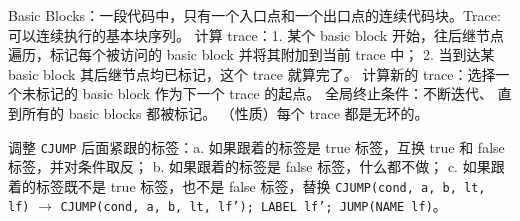 \par \noindent Basic Blocks：一段代码中，只有一个入口点和一个出口点的连续代码块。Trace: 可以连续执行的基本块序列。
计算 trace：1. 某个 basic block 开始，往后继节点遍历，标记每个被访问的 basic block 并将其附加到当前 trace 中；
2. 当到达某 basic block 其后继节点均已标记，这个 trace 就算完了。
计算新的 trace：选择一个未标记的 basic block 作为下一个 trace 的起点。
全局终止条件：不断迭代、 直到所有的 basic blocks 都被标记。
（性质）每个 trace 都是无环的。

\par \noindent 调整 \texttt{CJUMP} 后面紧跟的标签：a. 如果跟着的标签是 true 标签，互换 true 和 false 标签，并对条件取反；
b. 如果跟着的标签是 false 标签，什么都不做；
c. 如果跟着的标签既不是 true 标签，也不是 false 标签，替换 \texttt{CJUMP(cond, a, b, lt, lf)} $\rightarrow$
\texttt{CJUMP(cond, a, b, lt, lf'); LABEL lf'; JUMP(NAME lf)}。